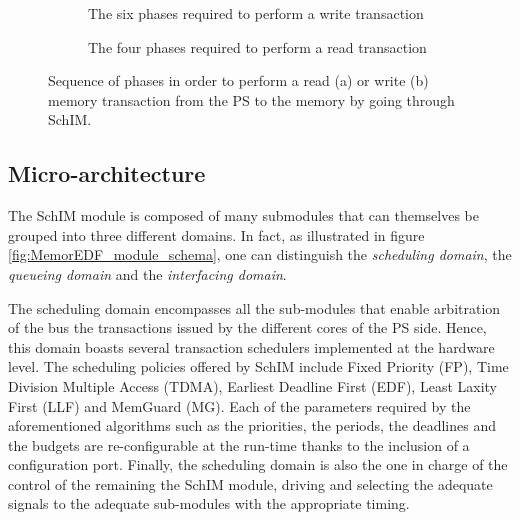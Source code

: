         \begin{figure}
            \begin{subfigure}{.5\textwidth}
                \centering
                
                \caption{The six phases required to perform a write transaction}
                \label{fig:Write_SchIM_communication_scheme}
            \end{subfigure}
            \par\bigskip
            \begin{subfigure}{.5\textwidth}
                \centering
                
                \caption{The four phases required to perform a read transaction}
                \label{fig:Read_SchIM_communication_scheme}
            \end{subfigure}
            \caption{Sequence of phases in order to perform a read (a) or write (b) memory transaction from the PS to the memory by going through SchIM.}
            \label{fig:SchIM_communication_scheme}
        \end{figure}

    \subsection{Micro-architecture}
        The SchIM module is composed of many submodules that can themselves be grouped into three different domains. In fact, as illustrated in figure \ref{fig:MemorEDF_module_schema}, one can distinguish the \emph{scheduling domain}, the \emph{queueing domain} and the \emph{interfacing domain}.

        The scheduling domain encompasses all the sub-modules that enable arbitration of the bus the transactions issued by the different cores of the PS side. Hence, this domain boasts several transaction schedulers implemented at the hardware level.
        The scheduling policies offered by SchIM include Fixed Priority (FP), Time Division Multiple Access (TDMA), Earliest Deadline First (EDF), Least Laxity First (LLF) and MemGuard (MG).
        Each of the parameters required by the aforementioned algorithms such as the priorities, the periods, the deadlines and the budgets are re-configurable at the run-time thanks to the inclusion of a configuration port.
        Finally, the scheduling domain is also the one in charge of the control of the remaining the SchIM module, driving and selecting the adequate signals to the adequate sub-modules with the appropriate timing.

